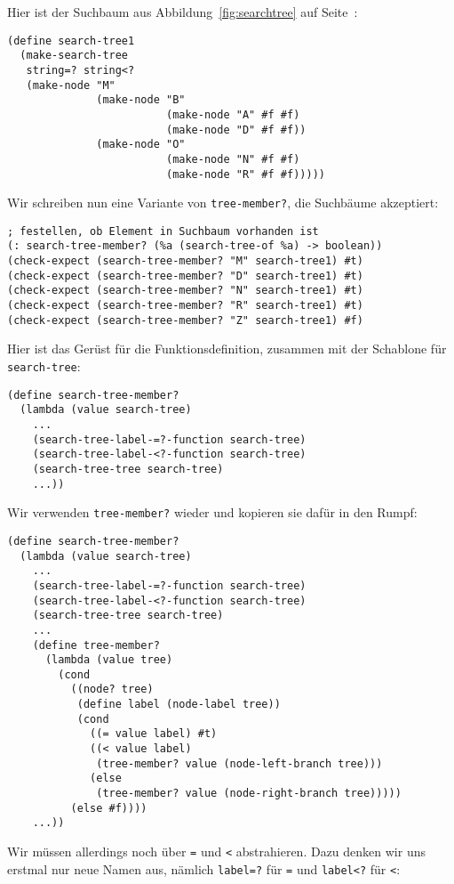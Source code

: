 Hier ist der Suchbaum aus Abbildung~\ref{fig:searchtree} auf
Seite~\pageref{fig:searchtree}:
%
\begin{lstlisting}
(define search-tree1
  (make-search-tree
   string=? string<?
   (make-node "M"
              (make-node "B"
                         (make-node "A" #f #f)
                         (make-node "D" #f #f))
              (make-node "O"
                         (make-node "N" #f #f)
                         (make-node "R" #f #f)))))
\end{lstlisting}
%
Wir schreiben nun eine Variante von \lstinline{tree-member?},
die Suchbäume 
akzeptiert:\label{func:search-tree-member}
%
\begin{lstlisting}
; festellen, ob Element in Suchbaum vorhanden ist
(: search-tree-member? (%a (search-tree-of %a) -> boolean))
(check-expect (search-tree-member? "M" search-tree1) #t)
(check-expect (search-tree-member? "D" search-tree1) #t)
(check-expect (search-tree-member? "N" search-tree1) #t)
(check-expect (search-tree-member? "R" search-tree1) #t)
(check-expect (search-tree-member? "Z" search-tree1) #f)
\end{lstlisting}
%
Hier ist das Gerüst für die Funktionsdefinition, zusammen mit der
Schablone für \lstinline{search-tree}:
%
\begin{lstlisting}
(define search-tree-member?
  (lambda (value search-tree)
    ...
    (search-tree-label-=?-function search-tree)
    (search-tree-label-<?-function search-tree)
    (search-tree-tree search-tree)
    ...))
\end{lstlisting}
%
Wir verwenden \lstinline{tree-member?} wieder und kopieren sie dafür
in den Rumpf:
%
\begin{lstlisting}
(define search-tree-member?
  (lambda (value search-tree)
    ...
    (search-tree-label-=?-function search-tree)
    (search-tree-label-<?-function search-tree)
    (search-tree-tree search-tree)
    ...
    (define tree-member?
      (lambda (value tree)
        (cond
          ((node? tree)
           (define label (node-label tree))
           (cond
             ((= value label) #t)
             ((< value label)
              (tree-member? value (node-left-branch tree)))
             (else
              (tree-member? value (node-right-branch tree)))))
          (else #f))))
    ...))
\end{lstlisting}
%
Wir müssen allerdings noch über \lstinline{=} und \lstinline{<}
abstrahieren.  Dazu denken wir uns erstmal nur neue Namen aus, nämlich
\lstinline{label=?} für \lstinline{=} und \lstinline{label<?} für \lstinline{<}:
